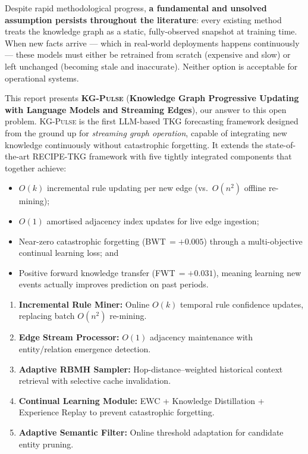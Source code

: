 \documentclass[10pt,a4paper,twocolumn]{article}
\theoremstyle{definition}
\newcommand{\ourmodel}{\textsc{KG-Pulse}}
\newcommand{\ourfull}{Knowledge Graph Progressive Updating with Language Models and Streaming Edges}
\newcommand{\basemodel}{RECIPE-TKG}
\begin{document}
Despite rapid methodological progress, \textbf{a fundamental and
unsolved assumption persists throughout the literature}: every existing
method treats the knowledge graph as a static, fully-observed snapshot
at training time.
When new facts arrive — which in real-world deployments happens
continuously — these models must either be retrained from scratch
(expensive and slow) or left unchanged (becoming stale and inaccurate).
Neither option is acceptable for operational systems.

This report presents \textbf{\ourmodel{}} (\textbf{\ourfull{}}),
our answer to this open problem.
\ourmodel{} is the first LLM-based TKG forecasting framework designed
from the ground up for \emph{streaming graph operation}, capable of
integrating new knowledge continuously without catastrophic forgetting.
It extends the state-of-the-art \basemodel{} framework
\cite{Akgul2025recipe} with five tightly integrated components that
together achieve:
\begin{itemize}[leftmargin=1.4em,itemsep=2pt,topsep=2pt]
  \item $O(k)$ incremental rule updating per new edge (vs.\ $O(n^2)$
        offline re-mining);
  \item $O(1)$ amortised adjacency index updates for live edge ingestion;
  \item Near-zero catastrophic forgetting (BWT\,$=+0.005$) through a
        multi-objective continual learning loss; and
  \item Positive forward knowledge transfer (FWT\,$=+0.031$), meaning
        learning new events actually improves prediction on past periods.
\end{itemize}

\begin{tcolorbox}[contributionbox]
\begin{enumerate}[leftmargin=1.2em,itemsep=2pt,topsep=0pt]
  \item \textbf{Incremental Rule Miner:} Online $O(k)$ temporal rule
        confidence updates, replacing batch $O(n^2)$ re-mining.
  \item \textbf{Edge Stream Processor:} $O(1)$ adjacency maintenance
        with entity/relation emergence detection.
  \item \textbf{Adaptive RBMH Sampler:} Hop-distance–weighted historical
        context retrieval with selective cache invalidation.
  \item \textbf{Continual Learning Module:} EWC + Knowledge Distillation
        + Experience Replay to prevent catastrophic forgetting.
  \item \textbf{Adaptive Semantic Filter:} Online threshold adaptation
        for candidate entity pruning.
\end{enumerate}
\end{tcolorbox}
\end{document}
